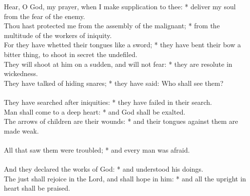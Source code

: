 \begin{Parallel}[v]{\colw}{\colx}
{}
{\vern
{\noindent
Hear, O God, my prayer, when I make supplication to thee: * deliver my soul from the fear of the enemy.\\
Thou hast protected me from the assembly of the malignant; * from the multitude of the workers of iniquity.\\
For they have whetted their tongues like a sword; * they have bent their bow a bitter thing, to shoot in secret the undefiled.\\
They will shoot at him on a sudden, and will not fear: * they are resolute in wickedness.\\
They have talked of hiding snares; * they have said: Who shall see them?\\ \\
They have searched after iniquities: * they have failed in their search.\\
Man shall come to a deep heart: * and God shall be exalted.\\
The arrows of children are their wounds: * and their tongues against them are made weak.\\ \\
All that saw them were troubled; * and every man was afraid.\\ \\
And they declared the works of God: * and understood his doings.\\
The just shall rejoice in the Lord, and shall hope in him: * and all the upright in heart shall be praised.}}

\end{Parallel}


